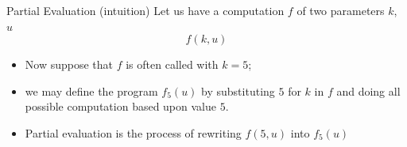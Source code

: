 \documentclass[aspectratio=169,dvipsnames]{beamer}
\begin{document}


        
    
    
    
    
    
    
    
    
    
    

\begin{frame}{Partial Evaluation (intuition)}
    Let us have a computation $f$ of two parameters $k$, $u$
    \[
        f(k,u)
    \]
    \begin{itemize}
    \item Now suppose that $f$ is often called with $k=5$; 
    
    \item we may define the program $f_5(u)$ by substituting $5$ for $k$ in $f$ 
    and doing all possible computation based upon value $5$.

    \item  Partial evaluation is the process of rewriting $f(5,u)$ into $f_5(u)$
    \end{itemize}
\end{frame}
 
\end{document}
